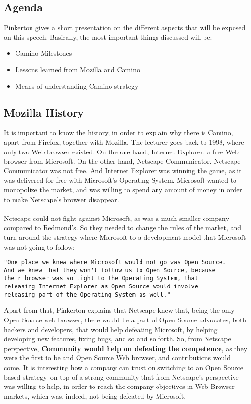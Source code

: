 \documentclass[11pt]{article}
\begin{document}
\subsection{Agenda}
Pinkerton gives a short presentation on the different aspects that will be exposed on this speech. Basically, the most important things discussed will be:
\begin{itemize}\itemsep0pt
\item{Camino Milestones}
\item{Lessons learned from Mozilla and Camino}
\item{Means of understanding Camino strategy}
\end{itemize}

\subsection{Mozilla History}
It is important to know the history, in order to explain why there is Camino, apart from Firefox, together with Mozilla. The lecturer goes back to 1998, where only two Web browser existed. On the one hand, Internet Explorer, a free Web browser from Microsoft. On the other hand, Netscape Communicator. Netscape Communicator was not free. And Internet Explorer was winning the game, as it was delivered for free with Microsoft's Operating System. Microsoft wanted to monopolize the market, and was willing to spend any amount of money in order to make Netscape's browser disappear.\\
\\
Netscape could not fight against Microsoft, as was a much smaller company compared to Redmond's. So they needed to change the rules of the market, and turn around the strategy where Microsoft to a development model that Microsoft was not going to follow:
\begin{verbatim}
"One place we knew where Microsoft would not go was Open Source.
And we knew that they won't follow us to Open Source, because
their browser was so tight to the Operating System, that
releasing Internet Explorer as Open Source would involve
releasing part of the Operating System as well."
\end{verbatim}
Apart from that, Pinkerton explains that Netscape knew that, being the only Open Source web browser, there would be a part of Open Source advocates, both hackers and developers, that would help defeating Microsoft, by helping developing new features, fixing bugs, and so and so forth. So, from Netscape perspective, \textbf{Community would help on defeating the competence}, as they were the first to be and Open Source Web browser, and contributions would come. It is interesting how a company can trust on switching to an Open Source based strategy, on top of a strong community that from Netscape's perspective was willing to help, in order to reach the company objectives in Web Browser markets, which was, indeed, not being defeated by Microsoft.\\
\end{document}
